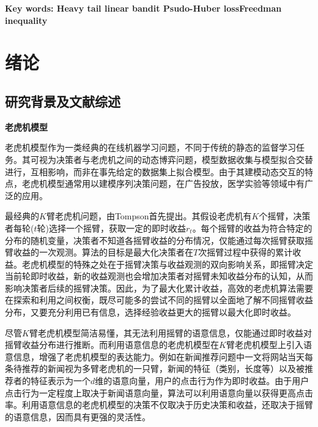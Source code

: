 \documentclass[UTF8,a4paper,10.5pt]{ctexart}
\begin{document}
\begin{flushleft}
	\normalsize{ \textbf{Key words:  Heavy tail linear bandit \quad Psudo-Huber loss\quad Freedman inequality}}
\end{flushleft}

\thispagestyle{empty}

\pagebreak
\tableofcontents

\thispagestyle{empty}
\newpage
\setcounter{page}{1}
\section{绪论}
\subsection{研究背景及文献综述}

\textbf{老虎机模型}

老虎机模型作为一类经典的在线机器学习问题，不同于传统的静态的监督学习任务。其可视为决策者与老虎机之间的动态博弈问题，模型数据收集与模型拟合交替进行，互相影响，而非在事先给定的数据集上拟合模型。由于其建模动态交互的特点，老虎机模型通常用以建模序列决策问题，在广告投放\cite{news_recommendation}，医学实验\cite{experiment_design}等领域中有广泛的应用\cite{MABappsurvey}。

最经典的$K$臂老虎机问题，由Tompson\cite{Thompson33}首先提出。其假设老虎机有$K$个摇臂，决策者每轮($t$轮)选择一个摇臂，获取一定的即时收益$r_t$。每个摇臂的收益为符合特定的分布的随机变量，决策者不知道各摇臂收益的分布情况，仅能通过每次摇臂获取摇臂收益的一次观测。算法的目标是最大化决策者在$T$次摇臂过程中获得的累计收益。老虎机模型的特殊之处在于摇臂决策与收益观测的双向影响关系，即摇臂决定当前轮即时收益，新的收益观测也会增加决策者对摇臂未知收益分布的认知，从而影响决策者后续的摇臂决策。因此，为了最大化累计收益，高效的老虎机算法需要在探索和利用之间权衡，既尽可能多的尝试不同的摇臂以全面地了解不同摇臂收益分布，又要充分利用已有信息，选择经验收益更大的摇臂以最大化即时收益。

尽管$K$臂老虎机模型简洁易懂，其无法利用摇臂的语意信息，仅能通过即时收益对摇臂收益分布进行推断。而利用语意信息的老虎机模型在$K$臂老虎机模型上引入语意信息，增强了老虎机模型的表达能力。例如在新闻推荐问题中\cite{news_recommendation}一文将网站当天每条待推荐的新闻视为多臂老虎机的一只臂，新闻的特征（类别，长度等）以及被推荐者的特征表示为一个$d$维的语意向量，用户的点击行为作为即时收益。由于用户点击行为一定程度上取决于新闻语意向量，算法可以利用语意向量以获得更高点击率。利用语意信息的老虎机模型的决策不仅取决于历史决策和收益，还取决于摇臂的语意信息，因而具有更强的灵活性。
\end{document}
